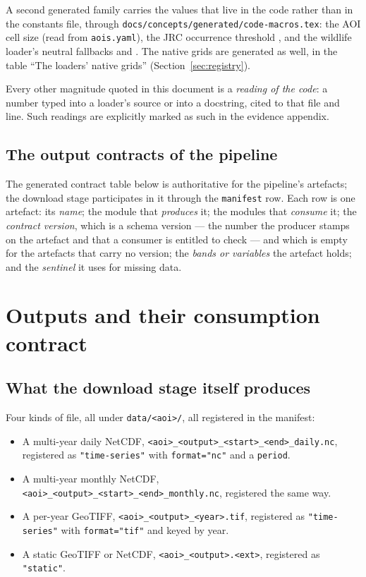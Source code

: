 \documentclass[11pt,a4paper]{article}
\newcommand{\code}[1]{\texttt{#1}}
\begin{document}
A second generated family carries the values that live in the code rather
than in the constants file, through
\code{docs/concepts/generated/code-macros.tex}: the AOI cell size
 (read from \code{aois.yaml}), the JRC
occurrence threshold , and
the wildlife loader's neutral fallbacks
 and
. The native grids are
generated as well, in the table ``The loaders' native grids''
(Section~\ref{sec:registry}).

Every other magnitude quoted in this document is a \emph{reading of the
code}: a number typed into a loader's source or into a docstring, cited to
that file and line. Such readings are explicitly marked as such in the
evidence appendix.

\subsection{The output contracts of the pipeline}

The generated contract table below is authoritative for the pipeline's
artefacts; the download stage participates in it through the \code{manifest}
row. Each row is one artefact: its \emph{name}; the module that \emph{produces}
it; the modules that \emph{consume} it; the \emph{contract version}, which is
a schema version --- the number the producer stamps on the artefact and that
a consumer is entitled to check --- and which is empty for the artefacts that
carry no version; the \emph{bands or variables} the artefact holds; and the
\emph{sentinel} it uses for missing data.



\section{Outputs and their consumption contract}
\label{sec:consumption}

\subsection{What the download stage itself produces}

Four kinds of file, all under \code{data/<aoi>/}, all registered in the
manifest:

\begin{itemize}
\item A multi-year daily NetCDF, \code{<aoi>\_<output>\_<start>\_<end>\_daily.nc},
registered as \code{"time-series"} with \code{format="nc"} and a
\code{period}.
\item A multi-year monthly NetCDF,
\code{<aoi>\_<output>\_<start>\_<end>\_monthly.nc}, registered the same way.
\item A per-year GeoTIFF, \code{<aoi>\_<output>\_<year>.tif}, registered as
\code{"time-series"} with \code{format="tif"} and keyed by year.
\item A static GeoTIFF or NetCDF, \code{<aoi>\_<output>.<ext>}, registered as
\code{"static"}.
\end{itemize}
\end{document}
